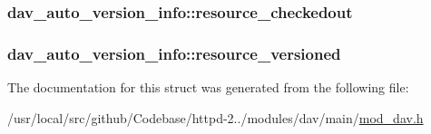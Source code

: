 \subsubsection[{\texorpdfstring{resource\+\_\+checkedout}{resource_checkedout}}]{ dav\+\_\+auto\+\_\+version\+\_\+info\+::resource\+\_\+checkedout}\hypertarget{structdav__auto__version__info_ad2830862ef4ed4bc05fd923371ebc95f}{}\label{structdav__auto__version__info_ad2830862ef4ed4bc05fd923371ebc95f}
\subsubsection[{\texorpdfstring{resource\+\_\+versioned}{resource_versioned}}]{ dav\+\_\+auto\+\_\+version\+\_\+info\+::resource\+\_\+versioned}\hypertarget{structdav__auto__version__info_a34883b8aa84af307dd0504c0c3900037}{}\label{structdav__auto__version__info_a34883b8aa84af307dd0504c0c3900037}


The documentation for this struct was generated from the following file\+:\begin{DoxyCompactItemize}
\item 
/usr/local/src/github/\+Codebase/httpd-\/2../modules/dav/main/\hyperlink{mod__dav_8h}{mod\+\_\+dav.\+h}\end{DoxyCompactItemize}
